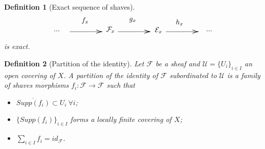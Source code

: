 \documentclass[a4paper,12pt]{article}
\newtheorem{Definition}{Definition}[section]
\begin{document}
\begin{Definition}[Exact sequence of shaves]
\begin{equation}
\begin{tikzpicture}[x=0.75pt,y=0.75pt,yscale=-1,xscale=1]
\draw    (80,191) -- (138.73,190.84) ;
\draw [shift={(140.73,190.83)}, rotate = 179.84] [color={rgb, 255:red, 0; green, 0; blue, 0 }  ][line width=0.75]    (10.93,-3.29) .. controls (6.95,-1.4) and (3.31,-0.3) .. (0,0) .. controls (3.31,0.3) and (6.95,1.4) .. (10.93,3.29)   ;
\draw    (260,191) -- (318.73,190.84) ;
\draw [shift={(320.73,190.83)}, rotate = 179.84] [color={rgb, 255:red, 0; green, 0; blue, 0 }  ][line width=0.75]    (10.93,-3.29) .. controls (6.95,-1.4) and (3.31,-0.3) .. (0,0) .. controls (3.31,0.3) and (6.95,1.4) .. (10.93,3.29)   ;
\draw    (170,191) -- (228.73,190.84) ;
\draw [shift={(230.73,190.83)}, rotate = 179.84] [color={rgb, 255:red, 0; green, 0; blue, 0 }  ][line width=0.75]    (10.93,-3.29) .. controls (6.95,-1.4) and (3.31,-0.3) .. (0,0) .. controls (3.31,0.3) and (6.95,1.4) .. (10.93,3.29)   ;

\draw (147,180.4) node [anchor=north west][inner sep=0.75pt]    {$\mathcal{F}_{x}$};
\draw (238,181.4) node [anchor=north west][inner sep=0.75pt]    {$\mathcal{E}_{x}$};
\draw (101,162.4) node [anchor=north west][inner sep=0.75pt]    {$f_{x}$};
\draw (277,166.4) node [anchor=north west][inner sep=0.75pt]    {$h_{x}$};
\draw (190,163.4) node [anchor=north west][inner sep=0.75pt]    {$g_{x}$};
\draw (49,187.4) node [anchor=north west][inner sep=0.75pt]    {$...$};
\draw (334,187.4) node [anchor=north west][inner sep=0.75pt]    {$...$};
\end{tikzpicture}
\end{equation}
is exact.

\end{Definition}


\begin{Definition}[Partition of the identity]
    Let $\mathcal{F}$ be a sheaf and $\mathcal{U}=\{U_i\}_{i \in I}$ an open covering of $X$. A partition of the identity of $\mathcal{F}$ subordinated to $\mathcal{U}$ is a family of shaves morphisms $f_i: \mathcal{F} \rightarrow \mathcal{F}$ such that
    \begin{itemize}
        \item $\overline{Supp(f_i)} \subset U_i \ \forall i$; 
        \item $\{Supp(f_i)\}_{i\in I}$ forms a locally finite covering of $X$;
        \item $\sum_{i \in I} f_i=id_{\mathcal{F}}$.
    \end{itemize}
\end{Definition}
\end{document}
